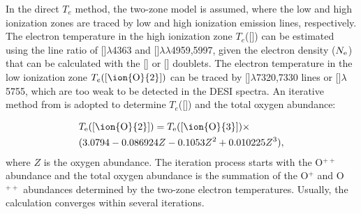 \documentclass[twocolumn]{aastex631}
\newcommand{\SII}{[\mbox{\ion{S}{2}}]}    %
\newcommand{\OIII}{[\mbox{\ion{O}{3}}]}   %
\newcommand{\NII}{[\mbox{\ion{N}{2}}]}   %
\newcommand{\OIIIFOT}{[\mbox{\ion{O}{3}}]$\lambda$4363}
\newcommand{\OII}{[\mbox{\ion{O}{2}}]}    %
\newcommand{\Te}{\mbox{$T_{\rm e}$}}
\newcommand{\Ne}{\mbox{$N_{\rm e}$}}
\begin{document}
In the direct $T_e$ method, the two-zone model is assumed, where the low and high ionization zones are traced by low and high ionization emission lines, respectively. The electron temperature in the high ionization zone $T_e$(\OIII) can be estimated using the line ratio of {\OIIIFOT} and \OIII$\lambda\lambda$4959,5997, given the electron density (\Ne) that can be calculated with the {\OII} or {\SII} doublets. The electron temperature in the low ionization zone $T_e(\OII)$ can be traced by \OII$\lambda$7320,7330 lines or \NII$\lambda$5755, which are too weak to be detected in the DESI spectra. An iterative method from \citet{Nic14} is adopted to determine $T_e$(\OII) and the total oxygen abundance:

\begin{equation}
\begin{split}
&\Te (\OII) = \Te(\OIII) \times \\
& (3.0794 - 0.086924Z - 0.1053Z^2 + 0.010225Z^3), \label{equ:OII}
\end{split}
\end{equation}
where $Z$ is the oxygen abundance. The iteration process starts with the O$^{++}$ abundance and the total oxygen abundance is the summation of the O$^+$ and O$^{++}$ abundances determined by the two-zone electron temperatures. Usually, the calculation converges within several iterations.  
\end{document}
